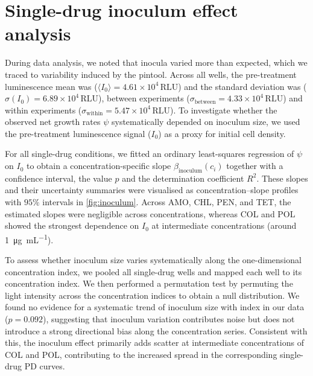 \section{Single-drug inoculum effect analysis}\label{ssec:inoculum}
During data analysis, we noted that inocula varied more than expected, which we traced to variability induced by the pintool.
Across all wells, the pre-treatment luminescence mean was (\(\langle I_0\rangle=4.61\times 10^{4}\,\mathrm{RLU}\)) and the standard deviation was (\(\sigma(I_0)=6.89\times 10^{4}\,\mathrm{RLU}\)), between experiments (\(\sigma_{\mathrm{between}}=4.33\times 10^{4}\,\mathrm{RLU}\)) and within experiments (\(\sigma_{\mathrm{within}}=5.47\times 10^{4}\,\mathrm{RLU}\)).
To investigate whether the observed net growth rates $\psi$ systematically depended on inoculum size, we used the pre-treatment luminescence signal ($I_0$) as a proxy for initial cell density.

For all single-drug  conditions, we fitted an ordinary least-squares regression of \(\psi\) on \(I_0\) to obtain a concentration-specific slope \(\beta_{\mathrm{inoculum}}(c_i)\) together with a confidence interval, the value \(p\) and the determination coefficient \(R^2\).
These slopes and their uncertainty summaries were visualised as concentration--slope profiles with \(95\%\) intervals in \autoref{fig:inoculum}.
Across AMO, CHL, PEN, and TET, the estimated slopes were negligible across concentrations, whereas COL and POL showed the strongest dependence on $I_0$ at intermediate concentrations (around \SI{1}{\micro\gram\per\milli\liter}).

To assess whether inoculum size varies systematically along the one-dimensional concentration index, we pooled all single-drug wells and mapped each well to its concentration index.
We then performed a permutation test  by permuting the light intensity across the concentration indices to obtain a null distribution.
We found no evidence for a systematic trend of inoculum size with index in our data ($p=0.092$), suggesting that inoculum variation contributes noise but does not introduce a strong directional bias along the concentration series.
Consistent with this, the inoculum effect primarily adds scatter at intermediate concentrations of COL and POL, contributing to the increased spread in the corresponding single-drug PD curves.
